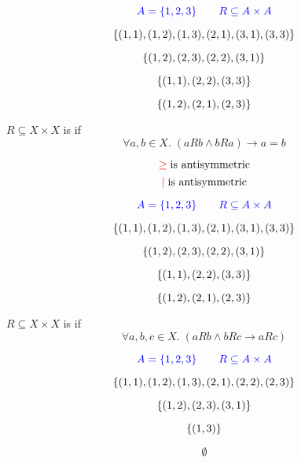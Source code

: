 \begin{frame}{}
  \[
    \textcolor{blue}{A = \{1, 2, 3\} \qquad R \subseteq A \times A}
  \]

  \pause
  \[
    \{(1, 1), (1, 2), (1, 3), (2, 1), (3, 1), (3, 3)\}
  \]

  \pause
  \[
    \{(1, 2), (2, 3), (2, 2), (3, 1)\}
  \]

  \pause
  \[
    \{(1, 1), (2, 2), (3, 3)\}
  \]

  \pause
  \[
    \{(1, 2), (2, 1), (2, 3)\}
  \]
\end{frame}

\begin{frame}{}
  \begin{definition}
    $R \subseteq X \times X$ is  if
    \[
      \forall a, b \in X.\; (a R b \land b R a) \to a = b
    \]
  \end{definition}

  \pause
  \[
    \textcolor{red}{\ge}\; \text{is antisymmetric}
  \]
  \pause
  \[
    \textcolor{red}{\mid}\; \text{is antisymmetric}
  \]
\end{frame}

\begin{frame}{}
  \[
    \textcolor{blue}{A = \{1, 2, 3\} \qquad R \subseteq A \times A}
  \]

  \pause
  \[
    \{(1, 1), (1, 2), (1, 3), (2, 1), (3, 1), (3, 3)\}
  \]

  \pause
  \[
    \{(1, 2), (2, 3), (2, 2), (3, 1)\}
  \]

  \pause
  \[
    \{(1, 1), (2, 2), (3, 3)\}
  \]

  \pause
  \[
    \{(1, 2), (2, 1), (2, 3)\}
  \]
\end{frame}

\begin{frame}{}
  \begin{definition}
    $R \subseteq X \times X$ is  if
    \[
      \forall a, b, c \in X.\; (a R b \land b R c \to a R c)
    \]

  \end{definition}
\end{frame}

\begin{frame}{}
  \[
    \textcolor{blue}{A = \{1, 2, 3\} \qquad R \subseteq A \times A}
  \]

  \pause
  \[
    \{(1, 1), (1, 2), (1, 3), (2, 1), (2, 2), (2, 3)\}
  \]

  \pause
  \[
    \{(1, 2), (2, 3), (3, 1)\}
  \]

  \pause
  \[
    \{(1, 3)\}
  \]

  \pause
  \[
    \emptyset
  \]
\end{frame}

